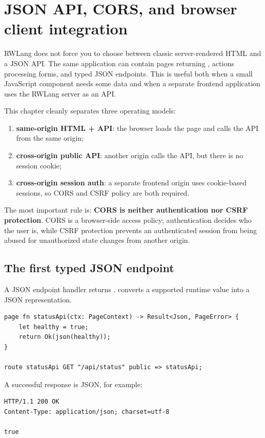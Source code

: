 \chapter{JSON API, CORS, and browser client integration}

RWLang does not force you to choose between classic server-rendered HTML and a JSON API. The same application can contain pages returning , actions processing forms, and typed JSON endpoints. This is useful both when a small JavaScript component needs some data and when a separate frontend application uses the RWLang server as an API.

This chapter cleanly separates three operating models:

\begin{enumerate}
  \item \textbf{same-origin HTML + API}: the browser loads the page and calls the API from the same origin;
  \item \textbf{cross-origin public API}: another origin calls the API, but there is no session cookie;
  \item \textbf{cross-origin session auth}: a separate frontend origin uses cookie-based sessions, so CORS and CSRF policy are both required.
\end{enumerate}

The most important rule is: \textbf{CORS is neither authentication nor CSRF protection}. CORS is a browser-side access policy; authentication decides who the user is, while CSRF protection prevents an authenticated session from being abused for unauthorized state changes from another origin.

\section{The first typed JSON endpoint}

A JSON endpoint handler returns .  converts a supported runtime value into a JSON representation.

\begin{lstlisting}[language=RWLang]
page fn statusApi(ctx: PageContext) -> Result<Json, PageError> {
    let healthy = true;
    return Ok(json(healthy));
}

route statusApi GET "/api/status" public => statusApi;
\end{lstlisting}

A successful response is JSON, for example:

\begin{lstlisting}
HTTP/1.1 200 OK
Content-Type: application/json; charset=utf-8

true
\end{lstlisting}

